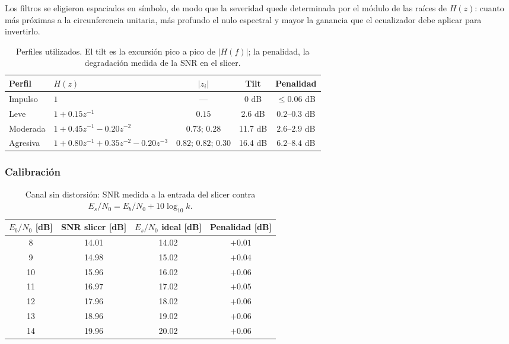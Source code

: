 Los filtros se eligieron espaciados en símbolo, de modo que la severidad quede
determinada por el módulo de las raíces de $H(z)$: cuanto más próximas a la
circunferencia unitaria, más profundo el nulo espectral y mayor la ganancia
que el ecualizador debe aplicar para invertirlo.
 
\begin{table}[H]
\centering
\small
\begin{tabular}{llccc}
\toprule
Perfil & $H(z)$ & $|z_i|$ & Tilt & Penalidad \\
\midrule
Impulso   & $1$ & --- & 0 dB & $\le 0.06$ dB \\
Leve      & $1 + 0.15z^{-1}$ & $0.15$ & 2.6 dB & $0.2$--$0.3$ dB \\
Moderada  & $1 + 0.45z^{-1} - 0.20z^{-2}$ & $0.73;\,0.28$ & 11.7 dB & $2.6$--$2.9$ dB \\
Agresiva  & $1 + 0.80z^{-1} + 0.35z^{-2} - 0.20z^{-3}$ & $0.82;\,0.82;\,0.30$ & 16.4 dB & $6.2$--$8.4$ dB \\
\bottomrule
\end{tabular}
\caption{Perfiles utilizados. El tilt es la excursión pico a pico de
$|H(f)|$; la penalidad, la degradación medida de la SNR en el slicer.}
\label{tab:ej2_canales}
\end{table}
 
\subsubsection*{Calibración}
 
\begin{table}[H]
\centering
\small
\begin{tabular}{cccc}
\toprule
$E_b/N_0$ [dB] & SNR slicer [dB] & $E_s/N_0$ ideal [dB] & Penalidad [dB] \\
\midrule
 8 & 14.01 & 14.02 & $+0.01$ \\
 9 & 14.98 & 15.02 & $+0.04$ \\
10 & 15.96 & 16.02 & $+0.06$ \\
11 & 16.97 & 17.02 & $+0.05$ \\
12 & 17.96 & 18.02 & $+0.06$ \\
13 & 18.96 & 19.02 & $+0.06$ \\
14 & 19.96 & 20.02 & $+0.06$ \\
\bottomrule
\end{tabular}
\caption{Canal sin distorsión: SNR medida a la entrada del slicer contra
$E_s/N_0 = E_b/N_0 + 10\log_{10}k$.}
\label{tab:ej2_calib}
\end{table}
 
